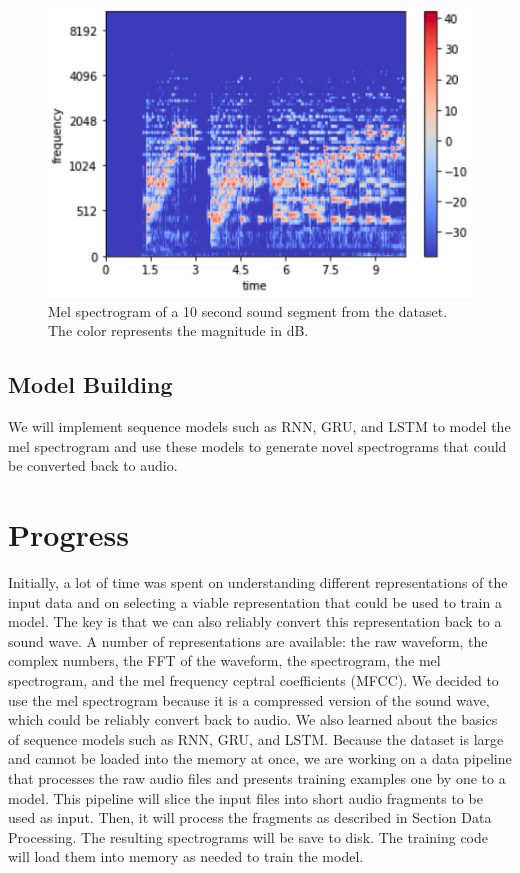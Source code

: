 \documentclass[sigconf,authorversion]{acmart}
\begin{document}
\begin{figure}[h]
  \centering
  \includegraphics[width=\linewidth]{mel_spec.png}
  \caption{Mel spectrogram of a 10 second sound segment from the dataset. The color represents the magnitude in dB.}
  \label{spectrogram}
\end{figure}

\subsection{Model Building}
We will implement sequence models such as RNN, GRU, and LSTM to model the mel spectrogram and use these models to
generate novel spectrograms that could be converted back to audio.

\section{Progress}
Initially, a lot of time was spent on understanding different representations of the input data and on selecting a
viable representation that could be used to train a model. The key is that we can also reliably convert this
representation back to a sound wave. A number of representations are available: the raw waveform, the complex numbers,
the FFT of the waveform, the spectrogram, the mel spectrogram, and the mel frequency ceptral coefficients (MFCC). We decided
to use the mel spectrogram because it is a compressed version of the sound wave, which could be reliably convert back to 
audio. We also learned about the basics of sequence models such as RNN, GRU, and LSTM. Because the dataset is large and 
cannot be loaded into the memory at once, we are working on a data pipeline that processes the raw audio files and presents training examples 
one by one to a model. This pipeline will slice the input files into short audio fragments to be used as input. Then,
it will process the fragments as described in Section Data Processing. The resulting spectrograms will be save
to disk. The training code will load them into memory as needed to train the model.



\end{document}
